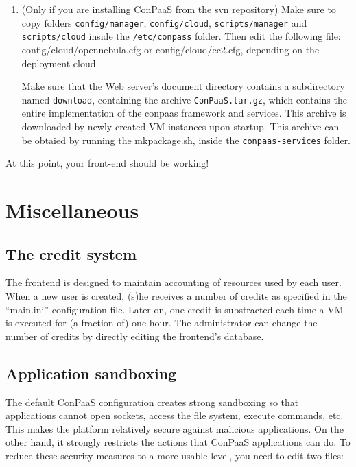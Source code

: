 \documentclass[10pt]{article}
\begin{document}
\begin{enumerate}
\item (Only if you are installing ConPaaS from the svn repository)
  Make sure to copy folders \verb+config/manager+, \verb+config/cloud+,
  \verb+scripts/manager+ and \verb+scripts/cloud+ inside the 
  \verb+/etc/conpass+ folder. Then edit the 
  following file: config/cloud/opennebula.cfg or config/cloud/ec2.cfg,
  depending on the deployment cloud.

  Make sure that the Web server's document directory contains a
  subdirectory named \verb+download+, containing the archive
  \verb+ConPaaS.tar.gz+, which contains the entire implementation
  of the conpaas framework and services. This archive is downloaded by newly
  created VM instances upon startup. This archive can be obtaied
  by running the mkpackage.sh, inside the \verb+conpaas-services+ folder.

\end{enumerate}

At this point, your front-end should be working!

\section{Miscellaneous}
\subsection{The credit system}

The frontend is designed to maintain accounting of resources used by
each user. When a new user is created, (s)he receives a number of
credits as specified in the ``main.ini'' configuration file. Later on,
one credit is substracted each time a VM is executed for (a fraction
of) one hour. The administrator can change the number of credits by
directly editing the frontend's database. 

\subsection{Application sandboxing}

The default ConPaaS configuration creates strong sandboxing so that
applications cannot open sockets, access the file system, execute
commands, etc. This makes the platform relatively secure against
malicious applications. On the other hand, it strongly restricts the
actions that ConPaaS applications can do. To reduce these security
measures to a more usable level, you need to edit two files:
\end{document}
